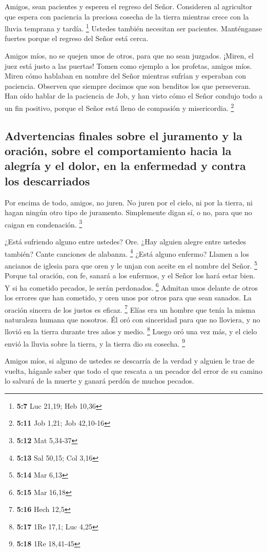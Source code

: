  Amigos, sean pacientes y esperen el regreso del Señor.
Consideren al agricultor que espera con paciencia la preciosa cosecha de
la tierra mientras crece con la lluvia temprana y tardía. \footnote{\textbf{5:7}
  Luc 21,19; Heb 10,36}  Ustedes también necesitan ser
pacientes. Manténganse fuertes porque el regreso del Señor está cerca.

 Amigos míos, no se quejen unos de otros, para que no sean
juzgados. ¡Miren, el juez está justo a las puertas! 
Tomen como ejemplo a los profetas, amigos míos. Miren cómo hablaban en
nombre del Señor mientras sufrían y esperaban con paciencia.
 Observen que siempre decimos que son benditos los que
perseveran. Han oído hablar de la paciencia de Job, y han visto cómo el
Señor condujo todo a un fin positivo, porque el Señor está lleno de
compasión y misericordia. \footnote{\textbf{5:11} Job 1,21; Job 42,10-16}

\hypertarget{advertencias-finales-sobre-el-juramento-y-la-oraciuxf3n-sobre-el-comportamiento-hacia-la-alegruxeda-y-el-dolor-en-la-enfermedad-y-contra-los-descarriados}{%
\subsection{Advertencias finales sobre el juramento y la oración, sobre
el comportamiento hacia la alegría y el dolor, en la enfermedad y contra
los
descarriados}\label{advertencias-finales-sobre-el-juramento-y-la-oraciuxf3n-sobre-el-comportamiento-hacia-la-alegruxeda-y-el-dolor-en-la-enfermedad-y-contra-los-descarriados}}

 Por encima de todo, amigos, no juren. No juren por el
cielo, ni por la tierra, ni hagan ningún otro tipo de juramento.
Simplemente digan sí, o no, para que no caigan en condenación.
\footnote{\textbf{5:12} Mat 5,34-37}

 ¿Está sufriendo alguno entre ustedes? Ore. ¿Hay alguien
alegre entre ustedes también? Cante canciones de alabanza. \footnote{\textbf{5:13}
  Sal 50,15; Col 3,16}  ¿Está alguno enfermo? Llamen a
los ancianos de iglesia para que oren y le unjan con aceite en el nombre
del Señor. \footnote{\textbf{5:14} Mar 6,13}  Porque tal
oración, con fe, sanará a los enfermos, y el Señor los hará estar bien.
Y si ha cometido pecados, le serán perdonados. \footnote{\textbf{5:15}
  Mar 16,18}  Admitan unos delante de otros los errores
que han cometido, y oren unos por otros para que sean sanados. La
oración sincera de los justos es eficaz. \footnote{\textbf{5:16} Hech
  12,5}  Elías era un hombre que tenía la misma
naturaleza humana que nosotros. Él oró con sinceridad para que no
lloviera, y no llovió en la tierra durante tres años y medio.
\footnote{\textbf{5:17} 1Re 17,1; Luc 4,25}  Luego oró
una vez más, y el cielo envió la lluvia sobre la tierra, y la tierra dio
su cosecha. \footnote{\textbf{5:18} 1Re 18,41-45}

 Amigos míos, si alguno de ustedes se descarría de la
verdad y alguien le trae de vuelta,  háganle saber que
todo el que rescata a un pecador del error de su camino lo salvará de la
muerte y ganará perdón de muchos pecados.

